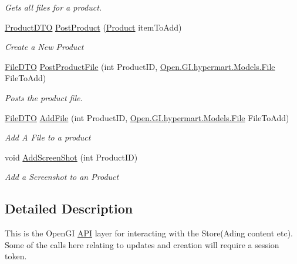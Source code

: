 \begin{DoxyCompactItemize}
\begin{DoxyCompactList}\small\item\em Gets all files for a product. \end{DoxyCompactList}\item 
\hyperlink{class_open_1_1_g_i_1_1hypermart_1_1_data_transformation_objects_1_1_product_d_t_o}{Product\+D\+T\+O} \hyperlink{class_open_1_1_g_i_1_1hypermart_1_1_controllers_1_1_store_content_controller_ac11817b427cdc3139f1a1022791d9697}{Post\+Product} (\hyperlink{class_open_1_1_g_i_1_1hypermart_1_1_models_1_1_product}{Product} item\+To\+Add)
\begin{DoxyCompactList}\small\item\em Create a New Product \end{DoxyCompactList}\item 
\hyperlink{class_open_1_1_g_i_1_1hypermart_1_1_data_transformation_objects_1_1_file_d_t_o}{File\+D\+T\+O} \hyperlink{class_open_1_1_g_i_1_1hypermart_1_1_controllers_1_1_store_content_controller_aeab9cb977ea719d1baa4610b3bc6a631}{Post\+Product\+File} (int Product\+I\+D, \hyperlink{class_open_1_1_g_i_1_1hypermart_1_1_models_1_1_file}{Open.\+G\+I.\+hypermart.\+Models.\+File} File\+To\+Add)
\begin{DoxyCompactList}\small\item\em Posts the product file. \end{DoxyCompactList}\item 
\hyperlink{class_open_1_1_g_i_1_1hypermart_1_1_data_transformation_objects_1_1_file_d_t_o}{File\+D\+T\+O} \hyperlink{class_open_1_1_g_i_1_1hypermart_1_1_controllers_1_1_store_content_controller_a36a438b2ab2cbb1d937b6a4c5bd8b17d}{Add\+File} (int Product\+I\+D, \hyperlink{class_open_1_1_g_i_1_1hypermart_1_1_models_1_1_file}{Open.\+G\+I.\+hypermart.\+Models.\+File} File\+To\+Add)
\begin{DoxyCompactList}\small\item\em Add A File to a product \end{DoxyCompactList}\item 
void \hyperlink{class_open_1_1_g_i_1_1hypermart_1_1_controllers_1_1_store_content_controller_a7c5b861d456ae7b592165634a07c6738}{Add\+Screen\+Shot} (int Product\+I\+D)
\begin{DoxyCompactList}\small\item\em Add a Screenshot to an Product \end{DoxyCompactList}\end{DoxyCompactItemize}


\subsection{Detailed Description}
This is the Open\+G\+I \hyperlink{namespace_open_1_1_g_i_1_1hypermart_1_1_controllers_1_1_a_p_i}{A\+P\+I} layer for interacting with the Store(\+Ading content etc). Some of the calls here relating to updates and creation will require a session token. 



